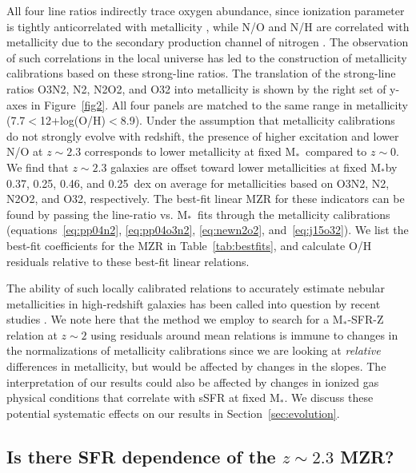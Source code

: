 \documentclass[iop,twocolappendix]{emulateapj}
\newcommand{\mstar}{$\mbox{M}_*$}
\begin{document}
All four line ratios indirectly trace oxygen abundance, since
 ionization parameter is tightly anticorrelated with metallicity \citep{dop06a,dop06b,per14,sanc15},
 while N/O and N/H are
 correlated with metallicity due to the secondary production channel of nitrogen \citep{kew02,pet04,per09}.
  The observation of such correlations in the local universe
 has led to the construction of metallicity calibrations based on these strong-line ratios.
  The translation of the strong-line ratios O3N2, N2, N2O2, and O32 into metallicity is shown by the
 right set of y-axes in Figure~\ref{fig2}.
  All four panels are matched to the same range in metallicity (7.7$<$12+log(O/H)$<$8.9).
  Under the assumption
 that metallicity calibrations do not strongly evolve with redshift, the presence of higher excitation
 and lower N/O at $z\sim2.3$ corresponds to lower metallicity at fixed \mstar\
 compared to $z\sim0$.  We find that $z\sim2.3$ galaxies are offset toward lower metallicities at fixed \mstar by
 0.37, 0.25, 0.46, and 0.25~dex on average for metallicities based on O3N2, N2, N2O2, and O32,
 respectively.  The best-fit linear MZR for these indicators can be found by passing the
 line-ratio vs. \mstar\ fits through the metallicity calibrations
 (equations~\ref{eq:pp04n2}, \ref{eq:pp04o3n2}, \ref{eq:newn2o2}, and~\ref{eq:j15o32}).
  We list the best-fit coefficients for the MZR in Table~\ref{tab:bestfits}, and calculate
 O/H residuals relative to these best-fit linear relations.

The ability of such locally calibrated relations to accurately estimate nebular metallicities
 in high-redshift galaxies has been called into question by recent studies
 \citep[e.g.,][]{ste14,san15,sha15,ste16,str17}.
  We note here that the method we employ to search for a \mstar-SFR-Z relation
 at $z\sim2$ using
 residuals around mean relations is immune to changes in the normalizations of metallicity
 calibrations since we are looking at \textit{relative} differences in metallicity,
 but would be affected by changes in the slopes.
  The interpretation of our results could also be affected by changes in ionized gas physical
 conditions that correlate with sSFR at fixed \mstar.
  We discuss these potential systematic effects on our results in Section~\ref{sec:evolution}.

\subsection{Is there SFR dependence of the $z\sim2.3$ MZR?}\label{sec:z2msz}
\end{document}
